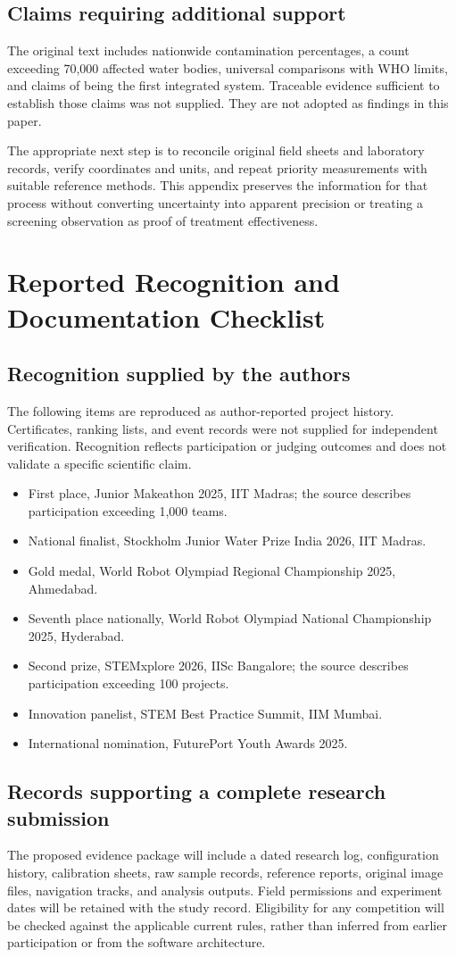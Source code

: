 \documentclass[12pt,a4paper]{article}
\newcommand{\papersection}[1]{\clearpage\section{#1}}
\begin{document}
\subsection{Claims requiring additional support}
The original text includes nationwide contamination percentages, a count exceeding 70,000 affected water bodies, universal comparisons with WHO limits, and claims of being the first integrated system. Traceable evidence sufficient to establish those claims was not supplied. They are not adopted as findings in this paper.

The appropriate next step is to reconcile original field sheets and laboratory records, verify coordinates and units, and repeat priority measurements with suitable reference methods. This appendix preserves the information for that process without converting uncertainty into apparent precision or treating a screening observation as proof of treatment effectiveness.

\papersection{Reported Recognition and Documentation Checklist}
\subsection{Recognition supplied by the authors}
The following items are reproduced as author-reported project history. Certificates, ranking lists, and event records were not supplied for independent verification. Recognition reflects participation or judging outcomes and does not validate a specific scientific claim.
\begin{itemize}
\item First place, Junior Makeathon 2025, IIT Madras; the source describes participation exceeding 1,000 teams.
\item National finalist, Stockholm Junior Water Prize India 2026, IIT Madras.
\item Gold medal, World Robot Olympiad Regional Championship 2025, Ahmedabad.
\item Seventh place nationally, World Robot Olympiad National Championship 2025, Hyderabad.
\item Second prize, STEMxplore 2026, IISc Bangalore; the source describes participation exceeding 100 projects.
\item Innovation panelist, STEM Best Practice Summit, IIM Mumbai.
\item International nomination, FuturePort Youth Awards 2025.
\end{itemize}

\subsection{Records supporting a complete research submission}
The proposed evidence package will include a dated research log, configuration history, calibration sheets, raw sample records, reference reports, original image files, navigation tracks, and analysis outputs. Field permissions and experiment dates will be retained with the study record. Eligibility for any competition will be checked against the applicable current rules, rather than inferred from earlier participation or from the software architecture.
\end{document}
